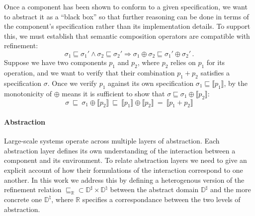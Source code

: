 \documentclass[sigplan,10pt,review,anonymous]{acmart}
\begin{document}
Once a component has been shown to conform to a given specification,
we want to abstract it as a ``black box''
so that further reasoning can be done in terms of
the component's specification rather than its implementation details.
To support this,
we must establish that semantic composition operators
are compatible with refinement:
\[ \sigma_1 \sqsubseteq \sigma_1' \wedge
   \sigma_2 \sqsubseteq \sigma_2' \Rightarrow
   \sigma_1 \oplus \sigma_2 \sqsubseteq \sigma_1' \oplus \sigma_2' \,. \]
Suppose we have two components $p_1$ and $p_2$,
where $p_2$ relies on $p_1$ for its operation,
and we want to verify that their combination $p_1 + p_2$
satisfies a specification $\sigma$.
Once we verify $p_1$ against its own specification
$\sigma_1 \sqsubseteq \llbracket p_1 \rrbracket$,
by the monotonicity of ${\oplus}$ means it is sufficient to show that
$\sigma \sqsubseteq \sigma_1 \oplus \llbracket p_2 \rrbracket$:
\[
   \sigma \:\sqsubseteq\:
   \sigma_1 \oplus \llbracket p_2 \rrbracket \:\sqsubseteq\:
   \llbracket p_1 \rrbracket \oplus \llbracket p_2 \rrbracket \:=\:
   \llbracket p_1 + p_2 \rrbracket
\]


\paragraph{Abstraction} %

Large-scale systems operate across multiple layers of abstraction.
Each abstraction layer defines its own understanding of the interaction
between a component and its environment.
To relate abstraction layers we need to give
an explicit account of how their formulations of the interaction
correspond to one another.
In this work we address this by defining a heterogenous version
of the refinement relation
${\sqsubseteq_\mathbb{R}} \subset
 \mathbb{D}^\sharp \times \mathbb{D}^\natural$ between
the abstract domain $\mathbb{D}^\sharp$ and
the more concrete one $\mathbb{D}^\natural$, where
$\mathbb{R}$ specifies a correspondance between
the two levels of abstraction.

\end{document}

